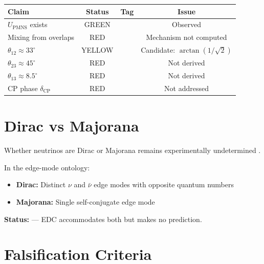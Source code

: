 \begin{center}
\begin{tabular}{lccc}
\toprule
\textbf{Claim} & \textbf{Status} & \textbf{Tag} & \textbf{Issue} \\
\midrule
$U_{\text{PMNS}}$ exists & GREEN & \tagBL{} & Observed \\
Mixing from overlaps & RED & \tagP{} & Mechanism not computed \\
$\theta_{12} \approx 33^\circ$ & YELLOW & \tagDcApprox{} & Candidate: $\arctan(1/\sqrt{2})$ \\
$\theta_{23} \approx 45^\circ$ & RED & \tagOpen{} & Not derived \\
$\theta_{13} \approx 8.5^\circ$ & RED & \tagOpen{} & Not derived \\
CP phase $\delta_{\text{CP}}$ & RED & \tagOpen{} & Not addressed \\
\bottomrule
\end{tabular}
\end{center}

\section{Dirac vs Majorana}
\label{sec:dirac_majorana}

Whether neutrinos are Dirac or Majorana remains experimentally undetermined \tagBL{}.

In the edge-mode ontology:
\begin{itemize}[nosep]
    \item \textbf{Dirac:} Distinct $\nu$ and $\bar\nu$ edge modes with opposite quantum numbers
    \item \textbf{Majorana:} Single self-conjugate edge mode
\end{itemize}

\textbf{Status:} \tagOpen{} --- EDC accommodates both but makes no prediction.

\section{Falsification Criteria}
\label{sec:nu_falsify}


